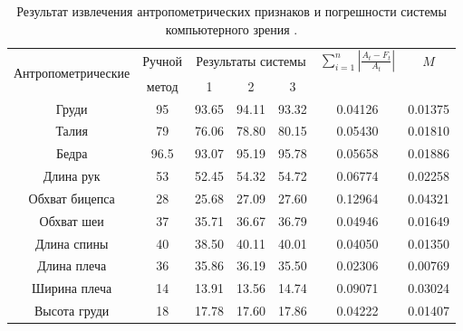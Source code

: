 \begin{table}[b!]%
\begin{center}
\caption{Результат извлечения антропометрических признаков и погрешности системы компьютерного зрения \cite{long1,long2}.}\label{tab1}
  \begin{tabular}{|c|c|c|c|c|c|c|}
    \hline
    \multirow{2}{*}{Антропометрические} & {Ручной} & \multicolumn{3}{c}{Результаты системы} & {$\sum^n_{i=1}\left|\frac{A_t-F_t}{A_t}\right|$} &{$M$} \\
      признаки& метод &1 &2 &3& & \\
    \hline
Груди &95	&93.65	&94.11	&93.32	&0.04126	&0.01375\\
\hline
Талия               &79	&76.06	&78.80	&80.15	&0.05430	&0.01810\\
\hline
Бедра               &96.5	&93.07	&95.19	&95.78	&0.05658	&0.01886\\
\hline
Длина рук           &53	  &52.45	&54.32	&54.72	&0.06774	&0.02258\\
\hline
Обхват бицепса      &28	 &25.68	  &27.09	&27.60	&0.12964	&0.04321\\
\hline
Обхват шеи          &37	 &35.71	  &36.67	&36.79	&0.04946	&0.01649\\
\hline
Длина спины         &40	 &38.50	  &40.11	&40.01	&0.04050	&0.01350\\
\hline
Длина плеча       &36	 &35.86	  &36.19	&35.50	&0.02306	&0.00769\\
\hline
Ширина плеча         &14	 &13.91	  &13.56	&14.74	&0.09071	&0.03024\\
\hline
Высота груди        &18	 &17.78	  &17.60	&17.86	&0.04222	&0.01407\\
\hline
  \end{tabular}
\end{center}
\end{table}%

